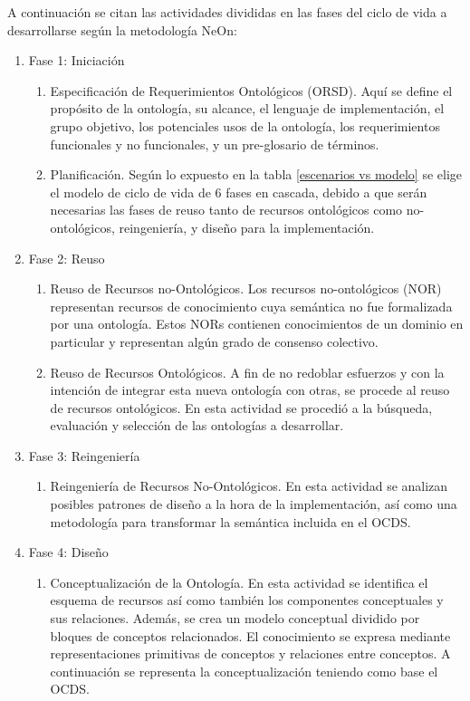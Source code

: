 A continuación se citan las actividades divididas en las fases del ciclo de vida a desarrollarse según la metodología NeOn:
\begin{enumerate}
\item Fase 1: Iniciación
    \begin{enumerate}
    \item Especificación de Requerimientos Ontológicos (ORSD). Aquí se define el propósito de la ontología, su alcance, el lenguaje de implementación, el grupo objetivo, los potenciales usos de la ontología, los requerimientos funcionales y no funcionales, y un pre-glosario de términos.

    \item Planificación. Según lo expuesto en la tabla \ref{escenarios vs modelo} se elige el modelo de ciclo de vida de 6 fases en cascada, debido a que serán necesarias las fases de reuso tanto de recursos ontológicos como no-ontológicos, reingeniería, y diseño para la implementación.
 
    \end{enumerate}
\item Fase 2: Reuso
    \begin{enumerate}
    \item Reuso de Recursos  no-Ontológicos. Los recursos no-ontológicos (NOR) representan recursos de conocimiento cuya semántica no fue formalizada por una ontología. Estos NORs contienen conocimientos de un dominio en particular y representan algún grado de consenso colectivo.

    \item Reuso de Recursos Ontológicos. A fin de no redoblar esfuerzos y con la intención de integrar esta nueva ontología con otras, se procede al reuso de recursos ontológicos. En esta actividad se procedió a la búsqueda, evaluación y selección de las ontologías a desarrollar.
    \end{enumerate}
\item Fase 3: Reingeniería
\begin{enumerate}
\item Reingeniería de Recursos No-Ontológicos. En esta actividad se analizan posibles patrones de diseño a la hora de la implementación, así como una metodología para transformar la semántica incluida en el OCDS.

\end{enumerate}
\item Fase 4: Diseño
\begin{enumerate}
\item Conceptualización de la Ontología. En esta actividad se identifica el esquema de recursos así como también los componentes conceptuales y sus relaciones. Además, se crea un modelo conceptual dividido por bloques de conceptos relacionados. El conocimiento se expresa mediante representaciones primitivas de conceptos y relaciones entre conceptos. A continuación se representa la conceptualización teniendo como base el OCDS. 


\end{enumerate}
\end{enumerate}
